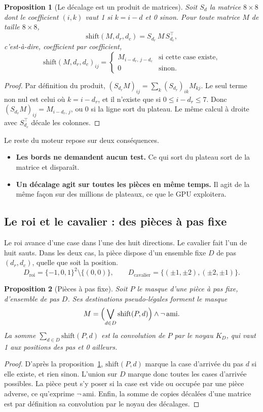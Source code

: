 \documentclass[11pt,a4paper]{article}
\newcommand{\shift}{\mathrm{shift}}
\newcounter{calcul}
\theoremstyle{plain}
\newtheorem{proposition}{Proposition}
\begin{document}
\begin{proposition}[Le décalage est un produit de matrices]\label{prop:decalage}
Soit $S_d$ la matrice $8\times8$ dont le coefficient $(i, k)$ vaut 1 si $k = i - d$ et 0 sinon.
Pour toute matrice $M$ de taille $8\times8$,
\[ \shift(M, d_r, d_c) = S_{d_r}\, M\, S_{d_c}^{\top}, \]
c'est-à-dire, coefficient par coefficient,
\[ \shift(M, d_r, d_c)_{ij} = \begin{cases} M_{i-d_r,\,j-d_c} & \text{si cette case existe,}\\ 0 &
\text{sinon.}\end{cases} \]
\end{proposition}
\begin{proof}
Par définition du produit, $(S_{d_r} M)_{ij} = \sum_k (S_{d_r})_{ik} M_{kj}$. Le seul terme non
nul est celui où $k = i - d_r$, et il n'existe que si $0 \le i - d_r \le 7$. Donc
$(S_{d_r} M)_{ij} = M_{i-d_r,\,j}$, ou 0 si la ligne sort du plateau. Le même calcul à droite
avec $S_{d_c}^{\top}$ décale les colonnes.
\end{proof}

Le reste du moteur repose sur deux conséquences.
\begin{itemize}
\item \textbf{Les bords ne demandent aucun test.} Ce qui sort du plateau sort de la matrice et
disparaît.
\item \textbf{Un décalage agit sur toutes les pièces en même temps.} Il agit de la même façon sur
des millions de plateaux, ce que le GPU exploitera.
\end{itemize}

\subsection{Le roi et le cavalier : des pièces à pas fixe}\label{th:roi}
Le roi avance d'une case dans l'une des huit directions. Le cavalier fait l'un de huit sauts.
Dans les deux cas, la pièce dispose d'un ensemble fixe $D$ de pas $(d_r, d_c)$, quelle que soit
la position.
\[ D_{\text{roi}} = \{-1, 0, 1\}^2 \setminus \{(0,0)\},\qquad
D_{\text{cavalier}} = \{(\pm1, \pm2), (\pm2, \pm1)\}. \]

\begin{proposition}[Pièces à pas fixe]\label{prop:pas}
Soit $P$ le masque d'une pièce à pas fixe, d'ensemble de pas $D$. Ses destinations
pseudo-légales forment le masque
\[ M = \Bigl(\bigvee_{d \in D} \shift(P, d)\Bigr) \wedge \neg\,\mathrm{ami}. \]
La somme $\sum_{d\in D}\shift(P, d)$ est la convolution de $P$ par le noyau $K_D$, qui vaut 1
aux positions des pas et 0 ailleurs.
\end{proposition}
\begin{proof}
D'après la proposition~\ref{prop:decalage}, $\shift(P, d)$ marque la case d'arrivée du pas $d$ si
elle existe, et rien sinon. L'union sur $D$ marque donc toutes les cases d'arrivée possibles. La
pièce peut s'y poser si la case est vide ou occupée par une pièce adverse, ce qu'exprime
$\neg\,\mathrm{ami}$. Enfin, la somme de copies décalées d'une matrice est par définition sa
convolution par le noyau des décalages.
\end{proof}
\end{document}
